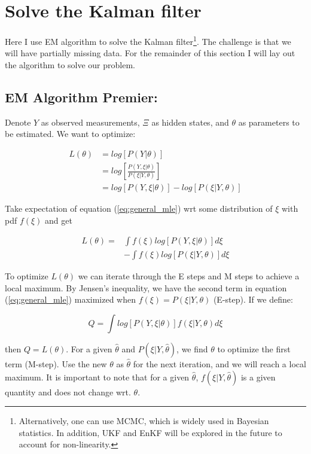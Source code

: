 \documentclass[12pt]{article}
\numberwithin{equation}{section}
\begin{document}
\section{Solve the Kalman filter} \label{sec:kf}

Here I use EM algorithm to solve the Kalman filter\footnote{Alternatively, one can use MCMC, which is widely used in Bayesian statistics. In addition, UKF and EnKF will be explored in the future to account for non-linearity.}. The challenge is that we will have partially missing data. For the remainder of this section I will lay out the algorithm to solve our problem.

\subsection{EM Algorithm Premier:} \label{subsec:premier}
Denote $Y$ as observed measurements, $\Xi$ as hidden states, and $\theta$ as parameters to be estimated. We want to optimize:

\begin{align}
    L(\theta) & = log[P(Y|\theta)] \nonumber \\
    & = log\left[\frac{P(Y,\xi|\theta)}{P(\xi|Y,\theta)}\right] \nonumber \\
    & = log[P(Y,\xi|\theta)] - log[P(\xi|Y,\theta)] \label{eq:general_mle}
\end{align}

Take expectation of equation (\ref{eq:general_mle}) wrt some distribution of $\xi$ with pdf $f(\xi)$ and get

\begin{align}
    L(\theta) = & \int f(\xi)log[P(Y,\xi|\theta)]d\xi \nonumber \\
    & - \int f(\xi)log[P(\xi|Y,\theta)]d\xi \nonumber
\end{align}

To optimize $L(\theta)$ we can iterate through the E steps and M steps to achieve a local maximum. By Jensen's inequality, we have the second term in equation (\ref{eq:general_mle}) maximized when $f(\xi)=P(\xi|Y,\theta)$ (E-step). If we define:

\[
    Q = \int log[P(Y,\xi|\theta)]f(\xi|Y,\theta)d\xi
\]

then $Q = L(\theta)$. For a given $\hat{\theta}$ and $P(\xi|Y, \hat{\theta})$, we find $\theta$ to optimize the first term (M-step). Use the new $\theta$ as $\hat{\theta}$ for the next iteration, and we will reach a local maximum. It is important to note that for a given $\hat{\theta}$, $f(\xi|Y, \hat{\theta})$ is a given quantity and does not change wrt. $\theta$. 
\end{document}

